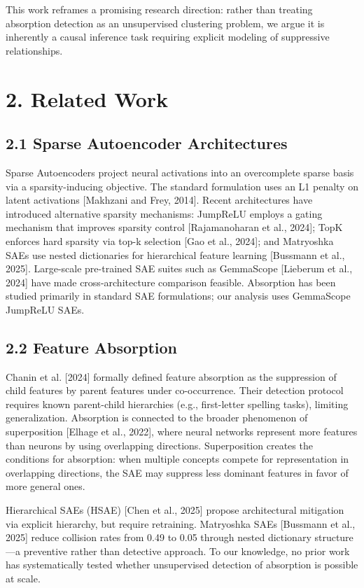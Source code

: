 \documentclass{article}
\begin{document}
This work reframes a promising research direction: rather than treating absorption detection as an unsupervised clustering problem, we argue it is inherently a causal inference task requiring explicit modeling of suppressive relationships.


\section{2. Related Work}

\subsection{2.1 Sparse Autoencoder Architectures}

Sparse Autoencoders project neural activations into an overcomplete sparse basis via a sparsity-inducing objective. The standard formulation uses an L1 penalty on latent activations [Makhzani and Frey, 2014]. Recent architectures have introduced alternative sparsity mechanisms: JumpReLU employs a gating mechanism that improves sparsity control [Rajamanoharan et al., 2024]; TopK enforces hard sparsity via top-k selection [Gao et al., 2024]; and Matryoshka SAEs use nested dictionaries for hierarchical feature learning [Bussmann et al., 2025]. Large-scale pre-trained SAE suites such as GemmaScope [Lieberum et al., 2024] have made cross-architecture comparison feasible. Absorption has been studied primarily in standard SAE formulations; our analysis uses GemmaScope JumpReLU SAEs.

\subsection{2.2 Feature Absorption}

Chanin et al. [2024] formally defined feature absorption as the suppression of child features by parent features under co-occurrence. Their detection protocol requires known parent-child hierarchies (e.g., first-letter spelling tasks), limiting generalization. Absorption is connected to the broader phenomenon of superposition [Elhage et al., 2022], where neural networks represent more features than neurons by using overlapping directions. Superposition creates the conditions for absorption: when multiple concepts compete for representation in overlapping directions, the SAE may suppress less dominant features in favor of more general ones.

Hierarchical SAEs (HSAE) [Chen et al., 2025] propose architectural mitigation via explicit hierarchy, but require retraining. Matryoshka SAEs [Bussmann et al., 2025] reduce collision rates from 0.49 to 0.05 through nested dictionary structure---a preventive rather than detective approach. To our knowledge, no prior work has systematically tested whether unsupervised detection of absorption is possible at scale.
\end{document}
